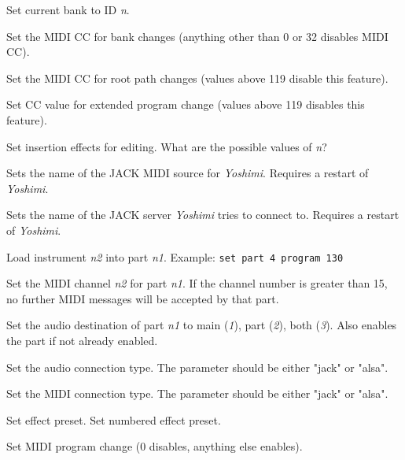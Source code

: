       Set current bank to ID \textsl{n}.

      Set the MIDI CC for bank changes (anything other than 0 or 32
      disables MIDI CC).

      Set the MIDI CC for root path changes (values above 119 disable this
      feature).

      Set CC value for extended program change (values above 119 disables this
      feature).

      Set insertion effects for editing.
      What are the possible values of \textsl{n}?

      Sets the name of the JACK MIDI source for \textsl{Yoshimi}.
      Requires a restart of \textsl{Yoshimi}.

      Sets the name of the JACK server \textsl{Yoshimi} tries to connect to.
      Requires a restart of \textsl{Yoshimi}.

      Load instrument \textsl{n2} into part \textsl{n1}.
      Example: \texttt{set part 4 program 130}

      Set the MIDI channel \textsl{n2} for part \textsl{n1}.
      If the channel number is greater than 15, no further MIDI
      messages will be accepted by that part.

      Set the audio destination of part \textsl{n1}
      to main (\textsl{1}), part (\textsl{2}), both (\textsl{3}).
      Also enables the part if not already enabled.

      Set the audio connection type.
      The parameter should be either "jack" or "alsa".

      Set the MIDI connection type.
      The parameter should be either "jack" or "alsa".

      Set effect preset.
      Set numbered effect preset.

      Set MIDI program change (0 disables, anything else enables).

